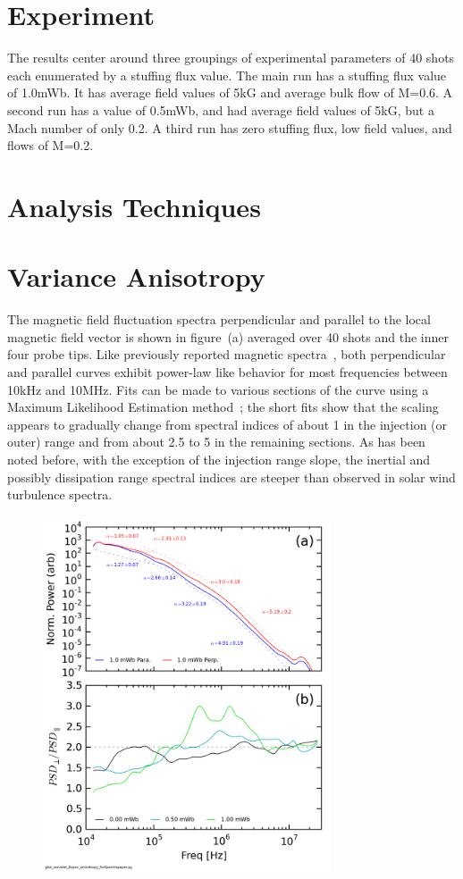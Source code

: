 \documentclass[aip,prl,amsmath,amssymb,reprint,superscriptaddress]{revtex4-1} %
\begin{document}
\section{Experiment}

The results center around three groupings of experimental parameters of 40 shots each enumerated by a stuffing flux value. The main run has a stuffing flux value of 1.0mWb. It has average field values of 5kG and average bulk flow of M=0.6. A second run has a value of 0.5mWb, and had average field values of 5kG, but a Mach number of only 0.2. A third run has zero stuffing flux, low field values, and flows of M=0.2.

\section{Analysis Techniques}

\section{Variance Anisotropy}

The magnetic field fluctuation spectra perpendicular and parallel to the local magnetic field vector is shown in figure~\cite{fig:spectra}(a) averaged over 40 shots and the inner four probe tips. Like previously reported magnetic spectra~\cite{schaffner14}, both perpendicular and parallel curves exhibit power-law like behavior for most frequencies between 10kHz and 10MHz. Fits can be made to various sections of the curve using a Maximum Likelihood Estimation method~\cite{clauset09}; the short fits show that the scaling appears to gradually change from spectral indices of about 1 in the injection (or outer) range and from about 2.5 to 5 in the remaining sections. As has been noted before, with the exception of the injection range slope, the inertial and possibly dissipation range spectral indices are steeper than observed in solar wind turbulence spectra.

\begin{figure}[!htbp]
\centerline{
\includegraphics[width=8.5cm]{Bperppara_chan1t4_1mWbspectra_40t60us_wAsymRatio}}
\caption{\label{fig:spectra}}
\end{figure}
\end{document}
